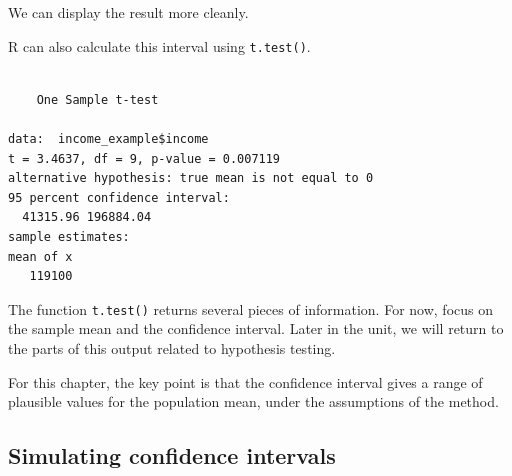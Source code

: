 \documentclass[
  letterpaper,
  DIV=11,
  numbers=noendperiod]{scrreprt}
\newenvironment{Shaded}{\begin{snugshade}}{\end{snugshade}}
\newcommand{\FunctionTok}[1]{\textcolor[rgb]{0.28,0.35,0.67}{#1}}
\newcommand{\NormalTok}[1]{\textcolor[rgb]{0.00,0.23,0.31}{#1}}
\newcommand{\SpecialCharTok}[1]{\textcolor[rgb]{0.37,0.37,0.37}{#1}}
\begin{document}
We can display the result more cleanly.

\begin{table}

\caption{\label{tbl-r-confidence-interval-manual}Manual 95\% confidence
interval for mean household income}


\end{table}%

R can also calculate this interval using \texttt{t.test()}.

\begin{Shaded}
\end{Shaded}

\begin{verbatim}

    One Sample t-test

data:  income_example$income
t = 3.4637, df = 9, p-value = 0.007119
alternative hypothesis: true mean is not equal to 0
95 percent confidence interval:
  41315.96 196884.04
sample estimates:
mean of x 
   119100 
\end{verbatim}

The function \texttt{t.test()} returns several pieces of information.
For now, focus on the sample mean and the confidence interval. Later in
the unit, we will return to the parts of this output related to
hypothesis testing.

For this chapter, the key point is that the confidence interval gives a
range of plausible values for the population mean, under the assumptions
of the method.

\subsection{Simulating confidence
intervals}\label{simulating-confidence-intervals}
\end{document}
